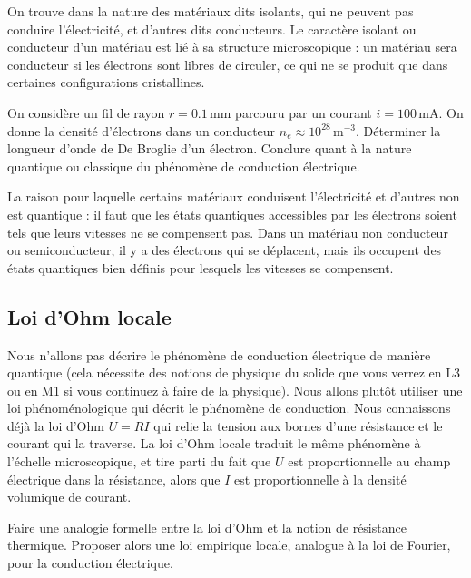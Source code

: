 \documentclass[11pt,fleqn]{book} %
\begin{document}
On trouve dans la nature des matériaux dits isolants, qui ne peuvent pas conduire l'électricité, et d'autres dits conducteurs. Le caractère isolant ou conducteur d'un matériau est lié à sa structure microscopique : un matériau sera conducteur si les électrons sont libres de circuler, ce qui ne se produit que dans certaines configurations cristallines.

\begin{capex}
	On considère un fil de rayon $r = 0.1$\,mm parcouru par un courant $i = 100$\,mA. On donne la densité d'électrons dans un conducteur $n_e \approx 10^{28}$\,m$^{-3}$. Déterminer la longueur d'onde de De Broglie d'un électron. Conclure quant à la nature quantique ou classique du phénomène de conduction électrique.
\end{capex}

\begin{remark}
	La raison pour laquelle certains matériaux conduisent l'électricité et d'autres non est quantique : il faut que les états quantiques accessibles par les électrons soient tels que leurs vitesses ne se compensent pas. Dans un matériau non conducteur ou semiconducteur, il y a des électrons qui se déplacent, mais ils occupent des états quantiques bien définis pour lesquels les vitesses se compensent. 
\end{remark}

\subsection{Loi d'Ohm locale}

Nous n'allons pas décrire le phénomène de conduction électrique de manière quantique (cela nécessite des notions de physique du solide que vous verrez en L3 ou en M1 si vous continuez à faire de la physique). Nous allons plutôt utiliser une loi phénoménologique qui décrit le phénomène de conduction. Nous connaissons déjà la loi d'Ohm $U = R I$ qui relie la tension aux bornes d'une résistance et le courant qui la traverse. La loi d'Ohm locale traduit le même phénomène à l'échelle microscopique, et tire parti du fait que $U$ est proportionnelle au champ électrique dans la résistance, alors que $I$ est proportionnelle à la densité volumique de courant.

\begin{capex}
	Faire une analogie formelle entre la loi d'Ohm et la notion de résistance thermique. Proposer alors une loi empirique locale, analogue à la loi de Fourier, pour la conduction électrique.
\end{capex}
\end{document}
